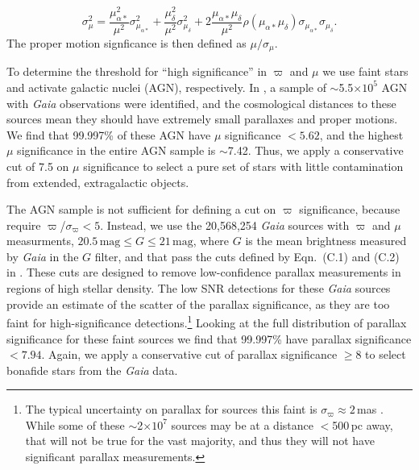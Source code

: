 \documentclass[twocolumn]{aastex62}
\begin{document}
\begin{CJK*}{UTF8}{gbsn}
%
$$ \sigma_\mu^2 = \frac{\mu_{\alpha\ast}^2}{\mu^2}\sigma_{\mu_{\alpha\ast}}^2 +
\frac{\mu_{\delta}^2}{\mu^2}\sigma_{\mu_{\delta}}^2 +
2\frac{\mu_{\alpha\ast}\mu_{\delta}}{\mu^2} \rho(\mu_{\alpha\ast}\mu_{\delta})
\sigma_{\mu_{\alpha\ast}}\sigma_{\mu_{\delta}}.$$
%
The proper motion signficance is then defined as $\mu/\sigma_\mu$.

To determine the threshold for ``high significance'' in $\varpi$ and $\mu$
we use faint stars and activate galactic nuclei (AGN), respectively. In
\citet{Lindegren18}, a sample of $\sim$5.5$\times10^{5}$ AGN with
\textit{Gaia} observations were identified, and the cosmological distances
to these sources mean they should have extremely small parallaxes and proper
motions. We find that 99.997\% of these AGN have $\mu$ significance $<
5.62$, and the highest $\mu$ significance in the entire AGN sample is
$\sim$7.42. Thus, we apply a conservative cut of 7.5 on $\mu$ significance
to select a pure set of stars with little contamination from extended,
extragalactic objects.

The AGN sample is not sufficient for defining a cut on $\varpi$ significance,
because \citet{Lindegren18} require $\varpi$/$\sigma_\varpi < 5$. Instead,
we use the 20,568,254 \textit{Gaia} sources with $\varpi$ and $\mu$
measurments, $20.5\,\mathrm{mag} \le G \le 21\,\mathrm{mag}$, where $G$ is
the mean brightness measured by \textit{Gaia} in the $G$ filter, and that
pass the cuts defined by Eqn.~(C.1) and (C.2) in \citet{Lindegren18}. These
cuts are designed to remove low-confidence parallax measurements in regions
of high stellar density. The low SNR detections for these \textit{Gaia}
sources provide an estimate of the scatter of the parallax significance, as
they are too faint for high-significance detections.\footnote{The typical
uncertainty on parallax for sources this faint is $\sigma_\varpi \approx
2$\,mas \citep{Lindegren18}. While some of these $\sim$2$\times10^7$ sources
may be at a distance $<$500\,pc away, that will not be true for the vast
majority, and thus they will not have significant parallax measurements.}
Looking at the full distribution of parallax significance for these faint
sources we find that 99.997\% have parallax significance $< 7.94$. Again, we
apply a conservative cut of parallax significance $\ge$8 to select bonafide
stars from the \textit{Gaia} data.


\end{CJK*}
\end{document}
